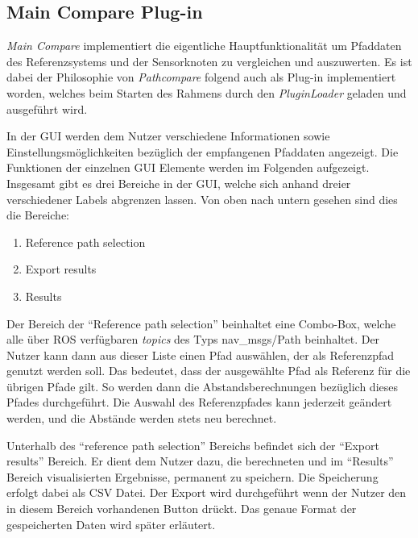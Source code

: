 \subsection{Main Compare Plug-in}
\label{sub:maincompare}


\textit{Main Compare} implementiert die eigentliche Hauptfunktionalität um Pfaddaten des
Referenzsystems und der Sensorknoten zu vergleichen und auszuwerten. 
Es ist dabei der Philosophie von \textit{Pathcompare} folgend auch als Plug-in
implementiert worden, welches beim Starten des Rahmens durch den
\textit{PluginLoader} geladen und ausgeführt wird.

In der GUI werden dem Nutzer verschiedene Informationen sowie
Einstellungsmöglichkeiten bezüglich der
empfangenen Pfaddaten angezeigt. Die Funktionen der einzelnen GUI Elemente
werden im Folgenden aufgezeigt.
Insgesamt gibt es drei Bereiche in der GUI, welche sich anhand dreier
verschiedener Labels abgrenzen lassen. Von oben nach untern gesehen sind
dies die Bereiche:

\begin{enumerate}
  \item Reference path selection
  \item Export results
  \item Results
\end{enumerate}


Der Bereich der ``Reference path selection'' beinhaltet eine Combo-Box, welche
alle über ROS verfügbaren \textit{topics} des Typs nav\_msgs/Path beinhaltet.
Der Nutzer kann dann aus dieser Liste einen Pfad auswählen, der als
Referenzpfad genutzt werden soll. Das bedeutet, dass der ausgewählte Pfad als
Referenz für die übrigen Pfade gilt. So werden dann die Abstandsberechnungen
bezüglich dieses Pfades durchgeführt. Die Auswahl des Referenzpfades kann
jederzeit geändert werden, und die Abstände werden stets neu berechnet.

Unterhalb des ``reference path selection'' Bereichs befindet sich der ``Export
results'' Bereich. Er dient dem Nutzer dazu, die berechneten und
im ``Results'' Bereich visualisierten Ergebnisse, permanent zu speichern.
Die Speicherung erfolgt dabei als \gls{CSV} Datei. Der Export wird durchgeführt
wenn der Nutzer den in diesem Bereich vorhandenen Button drückt. 
Das genaue Format der gespeicherten Daten wird später erläutert.

